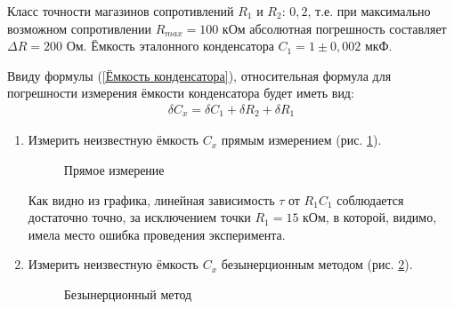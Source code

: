 \documentclass[a4paper, usenames, dvipsnames]{article}
\begin{document}
Класс точности магазинов сопротивлений $R_1$ и $R_2$: $0,2$,
т.е. при максимально возможном сопротивлении $R_{max} = 100$ кОм
абсолютная погрешность составляет $\Delta R = 200$ Ом.
Ёмкость эталонного конденсатора $C_1 = 1 \pm 0,002$ мкФ.

Ввиду формулы (\ref{Ёмкость конденсатора}),
относительная формула для погрешности измерения
ёмкости конденсатора будет иметь вид:
\begin{gather*}
  \delta C_x = \delta C_1 + \delta R_2 + \delta R_1
\end{gather*}

\begin{enumerate}
    \item Измерить неизвестную ёмкость $C_x$ прямым измерением (рис. \ref{Прямое измерение}).
          \begin{figure}[h]
              \centering
              \caption{Прямое измерение}
              \label{Прямое измерение}
          \end{figure}

          Как видно из графика, линейная зависимость $\tau$ от $R_1C_1$
          соблюдается достаточно точно,
          за исключением точки $R_1 = 15$ кОм, в которой, видимо,
          имела место ошибка проведения эксперимента.
    \item Измерить неизвестную ёмкость $C_x$ безынерционным методом (рис. \ref{Безынерционный метод}).

          \begin{figure}[h]
              \centering
              \caption{Безынерционный метод}
              \label{Безынерционный метод}
          \end{figure}


\end{enumerate}
\end{document}
